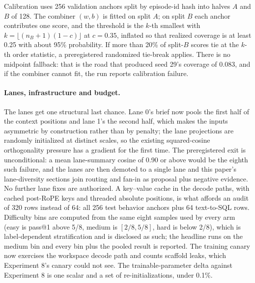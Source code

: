 \documentclass[10pt,a4paper]{article}
\begin{document}
Calibration uses 256 validation anchors split by episode-id hash into halves
$A$ and $B$ of 128. The combiner $(w,b)$ is fitted on split $A$; on split $B$
each anchor contributes one score, and the threshold is the $k$-th smallest
with $k = \lfloor (n_B+1)(1-c) \rfloor$ at $c = 0.35$, inflated so that
realized coverage is at least 0.25 with about 95\% probability. If more than
20\% of split-$B$ scores tie at the $k$-th order statistic, a preregistered
randomized tie-break applies. There is no midpoint fallback: that is the road
that produced seed 29's coverage of 0.083, and if the combiner cannot fit,
the run reports calibration failure.

\paragraph{Lanes, infrastructure and budget.}
The lanes get one structural last chance. Lane 0's brief now pools the first
half of the context positions and lane 1's the second half, which makes the
inputs asymmetric by construction rather than by penalty; the lane
projections are randomly initialized at distinct scales, so the existing
squared-cosine orthogonality pressure has a gradient for the first time. The
preregistered exit is unconditional: a mean lane-summary cosine of 0.90 or
above would be the eighth such failure, and the lanes are then demoted to a
single lane and this paper's lane-diversity sections join routing and fan-in
as proposal plus negative evidence. No further lane fixes are authorized.
A key--value cache in the decode paths, with cached post-RoPE keys and
threaded absolute positions, is what affords an audit of 320 rows instead of
64: all 256 test behavior anchors plus 64 text-to-SQL rows. Difficulty bins
are computed from the same eight samples used by every arm (easy is pass@1
above 5/8, medium is $[2/8, 5/8]$, hard is below 2/8), which is
label-dependent stratification and is disclosed as such; the headline runs on
the medium bin and every bin plus the pooled result is reported. The training
canary now exercises the workspace decode path and counts scaffold leaks,
which Experiment 8's canary could not see. The trainable-parameter delta against
Experiment 8 is one scalar and a set of re-initializations, under 0.1\%.
\end{document}
